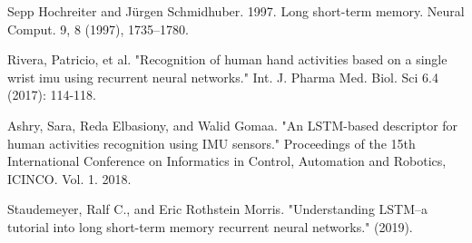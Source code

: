 \documentclass[10pt]{article}
\begin{document}
\begin{thebibliography}{9}
  
  \bibitem{}
  Sepp Hochreiter and Jürgen Schmidhuber. 1997. Long short-term memory. Neural Comput. 9, 8 (1997), 1735–1780.

  \bibitem{}
  Rivera, Patricio, et al. "Recognition of human hand activities based on a single wrist imu using recurrent neural networks." Int. J. Pharma Med. Biol. Sci 6.4 (2017): 114-118.
  
  \bibitem{}
  Ashry, Sara, Reda Elbasiony, and Walid Gomaa. "An LSTM-based descriptor for human activities recognition using IMU sensors." Proceedings of the 15th International Conference on Informatics in Control, Automation and Robotics, ICINCO. Vol. 1. 2018.

  \bibitem{}
  Staudemeyer, Ralf C., and Eric Rothstein Morris. "Understanding LSTM--a tutorial into long short-term memory recurrent neural networks." (2019).
\end{thebibliography}
\end{document}
